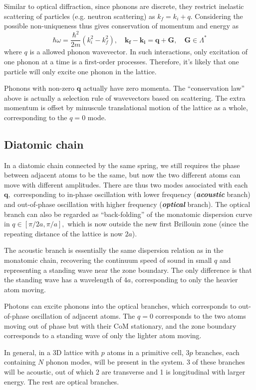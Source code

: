 \documentclass{article}
\theoremstyle{nonumberplain}
\begin{document}
Similar to optical diffraction, since phonons are discrete, they restrict inelastic scattering of particles (e.g. neutron scattering) as $k_f = k_i + q.$ Considering the possible non-uniqueness thus gives conservation of momentum and energy as
\[
    \boxed{\hbar \omega = \frac{\hbar ^{2} }{2m}(k_i ^{2} - k_f ^{2} ), \quad 
    \mathbf{k_f} - \mathbf{k_i} = \mathbf{q} + \mathbf{G},  \quad \mathbf{G} \in \Lambda^{*}}
\]
where $q$ is a allowed phonon wavevector. In such interactions, only excitation of one phonon at a time is a first-order processes. Therefore, it's likely that one particle will only excite one phonon in the lattice. 

Phonons with non-zero $\mathbf{q}$ actually have zero momenta. The ``conservation law'' above is actually a selection rule of wavevectors based on scattering. The extra momentum is offset by minuscule translational motion of the lattice as a whole, corresponding to the $q=0$ mode. 
\subsection{Diatomic chain}

In a diatomic chain connected by the same spring, we still requires the phase between adjacent atoms to be the same, but now the two different atoms can move with different amplitudes. There are thus two modes associated with each $\mathbf{q},$ corresponding to in-phase oscillation with lower frequency (\textit{\textbf{acoustic}} branch) and out-of-phase oscillation with higher frequency (\textit{\textbf{optical}} branch). The optical branch can also be regarded as ``back-folding'' of the monatomic dispersion curve in $q \in [\pi / 2a, \pi /a],$ which is now outside the new first Brillouin zone (since the repeating distance of the lattice is now $2a$). 

The acoustic branch is essentially the same dispersion relation as in the monatomic chain, recovering the continuum speed of sound in small $q$ and representing a standing wave near the zone boundary. The only difference is that the standing wave has a wavelength of $4a$, corresponding to only the heavier atom moving. 

Photons can excite phonons into the optical branches, which corresponds to out-of-phase oscillation of adjacent atoms. The $q=0$ corresponds to the two atoms moving out of phase but with their CoM stationary, and the zone boundary corresponds to a standing wave of only the lighter atom moving. 

In general, in a 3D lattice with $p$ atoms in a primitive cell, $3p$ branches, each containing $N$ phonon modes, will be present in the system. $3$ of these branches will be acoustic, out of which 2 are transverse and 1 is longitudinal with larger energy. The rest are optical branches. 
\end{document}
